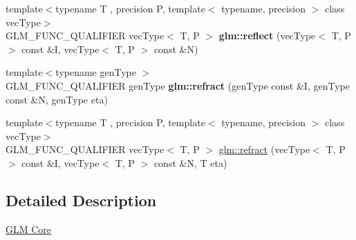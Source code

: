 \begin{DoxyCompactItemize}
{\footnotesize template$<$typename T , precision P, template$<$ typename, precision $>$ class vec\+Type$>$ }\\G\+L\+M\+\_\+\+F\+U\+N\+C\+\_\+\+Q\+U\+A\+L\+I\+F\+I\+ER vec\+Type$<$ T, P $>$ {\bfseries glm\+::reflect} (vec\+Type$<$ T, P $>$ const \&I, vec\+Type$<$ T, P $>$ const \&N)
\item 
\mbox{\label{func__geometric_8inl_ae4b0245b42a72957d3026ac365731821}} 
{\footnotesize template$<$typename gen\+Type $>$ }\\G\+L\+M\+\_\+\+F\+U\+N\+C\+\_\+\+Q\+U\+A\+L\+I\+F\+I\+ER gen\+Type {\bfseries glm\+::refract} (gen\+Type const \&I, gen\+Type const \&N, gen\+Type eta)
\item 
{\footnotesize template$<$typename T , precision P, template$<$ typename, precision $>$ class vec\+Type$>$ }\\G\+L\+M\+\_\+\+F\+U\+N\+C\+\_\+\+Q\+U\+A\+L\+I\+F\+I\+ER vec\+Type$<$ T, P $>$ \hyperlink{group__core__func__geometric_gab7e7cdf4403931a5f7b74560ad64159b}{glm\+::refract} (vec\+Type$<$ T, P $>$ const \&I, vec\+Type$<$ T, P $>$ const \&N, T eta)
\end{DoxyCompactItemize}


\subsection{Detailed Description}
\hyperlink{group__core}{G\+LM Core} 